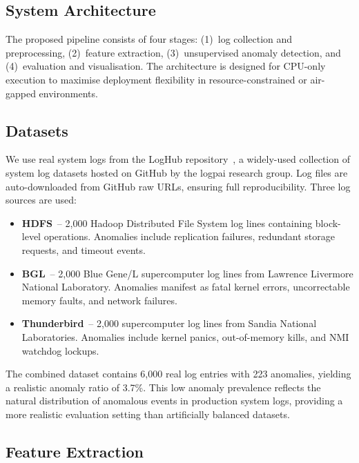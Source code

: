 \documentclass[conference]{IEEEtran}
\begin{document}
\subsection{System Architecture}

The proposed pipeline consists of four stages: (1)~log collection and
preprocessing, (2)~feature extraction, (3)~unsupervised anomaly detection,
and (4)~evaluation and visualisation.  The architecture is designed for
CPU-only execution to maximise deployment flexibility in resource-constrained
or air-gapped environments.

\subsection{Datasets}

We use real system logs from the LogHub repository~\cite{zhu2019}, a
widely-used collection of system log datasets hosted on GitHub by the logpai
research group. Log files are auto-downloaded from GitHub raw URLs, ensuring
full reproducibility. Three log sources are used:

\begin{itemize}
    \item \textbf{HDFS}~-- 2,000 Hadoop Distributed File System log lines
          containing block-level operations. Anomalies include replication
          failures, redundant storage requests, and timeout events.
    \item \textbf{BGL}~-- 2,000 Blue Gene/L supercomputer log lines from
          Lawrence Livermore National Laboratory. Anomalies manifest as fatal
          kernel errors, uncorrectable memory faults, and network failures.
    \item \textbf{Thunderbird}~-- 2,000 supercomputer log lines from Sandia
          National Laboratories. Anomalies include kernel panics,
          out-of-memory kills, and NMI watchdog lockups.
\end{itemize}

The combined dataset contains 6{,}000 real log entries with 223 anomalies,
yielding a realistic anomaly ratio of 3.7\%. This low anomaly prevalence
reflects the natural distribution of anomalous events in production system
logs, providing a more realistic evaluation setting than artificially balanced
datasets.

\subsection{Feature Extraction}
\end{document}
